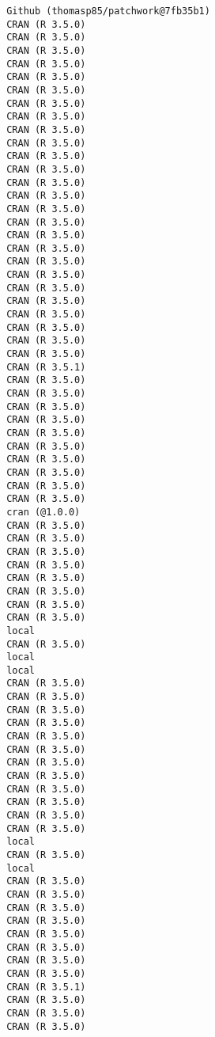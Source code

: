 \documentclass[twoside,12pt,final]{ucthesis-CA2012}
\begin{document}
\begin{ucmainmatter}
\begin{verbatim}
 Github (thomasp85/patchwork@7fb35b1)
 CRAN (R 3.5.0)                      
 CRAN (R 3.5.0)                      
 CRAN (R 3.5.0)                      
 CRAN (R 3.5.0)                      
 CRAN (R 3.5.0)                      
 CRAN (R 3.5.0)                      
 CRAN (R 3.5.0)                      
 CRAN (R 3.5.0)                      
 CRAN (R 3.5.0)                      
 CRAN (R 3.5.0)                      
 CRAN (R 3.5.0)                      
 CRAN (R 3.5.0)                      
 CRAN (R 3.5.0)                      
 CRAN (R 3.5.0)                      
 CRAN (R 3.5.0)                      
 CRAN (R 3.5.0)                      
 CRAN (R 3.5.0)                      
 CRAN (R 3.5.0)                      
 CRAN (R 3.5.0)                      
 CRAN (R 3.5.0)                      
 CRAN (R 3.5.0)                      
 CRAN (R 3.5.0)                      
 CRAN (R 3.5.0)                      
 CRAN (R 3.5.0)                      
 CRAN (R 3.5.0)                      
 CRAN (R 3.5.0)                      
 CRAN (R 3.5.1)                      
 CRAN (R 3.5.0)                      
 CRAN (R 3.5.0)                      
 CRAN (R 3.5.0)                      
 CRAN (R 3.5.0)                      
 CRAN (R 3.5.0)                      
 CRAN (R 3.5.0)                      
 CRAN (R 3.5.0)                      
 CRAN (R 3.5.0)                      
 CRAN (R 3.5.0)                      
 CRAN (R 3.5.0)                      
 cran (@1.0.0)                       
 CRAN (R 3.5.0)                      
 CRAN (R 3.5.0)                      
 CRAN (R 3.5.0)                      
 CRAN (R 3.5.0)                      
 CRAN (R 3.5.0)                      
 CRAN (R 3.5.0)                      
 CRAN (R 3.5.0)                      
 CRAN (R 3.5.0)                      
 local                               
 CRAN (R 3.5.0)                      
 local                               
 local                               
 CRAN (R 3.5.0)                      
 CRAN (R 3.5.0)                      
 CRAN (R 3.5.0)                      
 CRAN (R 3.5.0)                      
 CRAN (R 3.5.0)                      
 CRAN (R 3.5.0)                      
 CRAN (R 3.5.0)                      
 CRAN (R 3.5.0)                      
 CRAN (R 3.5.0)                      
 CRAN (R 3.5.0)                      
 CRAN (R 3.5.0)                      
 CRAN (R 3.5.0)                      
 local                               
 CRAN (R 3.5.0)                      
 local                               
 CRAN (R 3.5.0)                      
 CRAN (R 3.5.0)                      
 CRAN (R 3.5.0)                      
 CRAN (R 3.5.0)                      
 CRAN (R 3.5.0)                      
 CRAN (R 3.5.0)                      
 CRAN (R 3.5.0)                      
 CRAN (R 3.5.0)                      
 CRAN (R 3.5.1)                      
 CRAN (R 3.5.0)                      
 CRAN (R 3.5.0)                      
 CRAN (R 3.5.0)                      
\end{verbatim}
\backmatter


\end{ucmainmatter}
\end{document}
